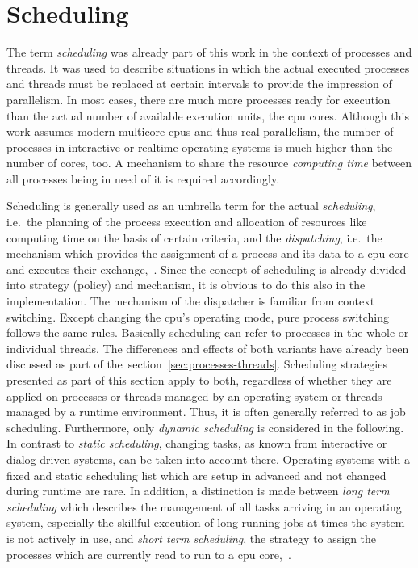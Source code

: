 \section{Scheduling}\label{sec:scheduling}
The term \textit{scheduling} was already part of this work in the context of processes and threads.
It was used to describe situations in which the actual executed processes and threads must be replaced at certain intervals to provide the impression of parallelism.
In most cases, there are much more processes ready for execution than the actual number of available execution units, the \ac{cpu} cores.
Although this work assumes modern multicore \acp{cpu} and thus real parallelism, the number of processes in interactive or realtime operating systems is much higher than the number of cores, too.
A mechanism to share the resource \textit{computing time} between all processes being in need of it is required accordingly.

Scheduling is generally used as an umbrella term for the actual \textit{scheduling}, i.e.\ the planning of the process execution and allocation of resources like computing time on the basis of certain criteria, and the \textit{dispatching}, i.e.\ the mechanism which provides the assignment of a process and its data to a \ac{cpu} core and executes their exchange\cite{brause2017betriebssysteme},~\cite{mandl2014Grundkurs}.
Since the concept of scheduling is already divided into strategy (policy) and mechanism, it is obvious to do this also in the implementation.
The mechanism of the dispatcher is familiar from context switching.
Except changing the \ac{cpu}'s operating mode, pure process switching follows the same rules.
Basically scheduling can refer to processes in the whole or individual threads\cite{mandl2014Grundkurs}.
The differences and effects of both variants have already been discussed as part of the~section~\ref{sec:processes-threads}.
Scheduling strategies presented as part of this section apply to both, regardless of whether they are applied on processes or threads managed by an operating system or threads managed by a runtime environment.
Thus, it is often generally referred to as job scheduling\cite{mandl2014Grundkurs}.
Furthermore, only \textit{dynamic scheduling} is considered in the following.
In contrast to \textit{static scheduling}, changing tasks, as known from interactive or dialog driven systems, can be taken into account there.
Operating systems with a fixed and static scheduling list which are setup in advanced and not changed during runtime are rare\cite{brause2017betriebssysteme}.
In addition, a distinction is made between \textit{long term scheduling} which describes the management of all tasks arriving in an operating system, especially the skillful execution of long-running jobs at times the system is not actively in use, and \textit{short term scheduling}, the strategy to assign the processes which are currently read to run to a \ac{cpu} core\cite{brause2017betriebssysteme},~\cite{mandl2014Grundkurs}.


